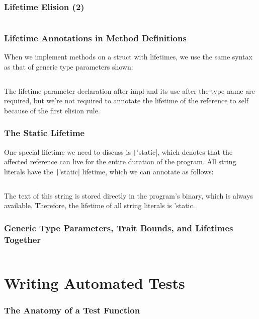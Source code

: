 \documentclass{beamer}
\begin{document}
\begin{frame}[fragile]
	\frametitle{Lifetime Elision (2)}
	
	\inputminted[fontsize=\scriptsize]{rust}{./code/lifetime7.rs}
\end{frame}


\begin{frame}[fragile]
	\frametitle{Lifetime Annotations in Method Definitions}
	When we implement methods on a struct with lifetimes, we use the same syntax as that of generic type parameters shown: 
	
	\inputminted{rust}{./code/lifetime8.rs}
	
	The lifetime parameter declaration after impl and its use after the type name are required, but we’re not required to annotate the lifetime of the reference to self because of the first elision rule.
\end{frame}

\begin{frame}[fragile]
	\frametitle{The Static Lifetime}
	One special lifetime we need to discuss is \texttt|'static|, which denotes that the affected reference can live for the entire duration of the program. All string literals have the \texttt|'static| lifetime, which we can annotate as follows:
	
	\inputminted{rust}{./code/lifetime9.rs}
	
	The text of this string is stored directly in the program’s binary, which is always available. Therefore, the lifetime of all string literals is 'static.
\end{frame}


\begin{frame}[fragile]
	\frametitle{Generic Type Parameters, Trait Bounds, and Lifetimes Together}
	
	\inputminted{rust}{./code/lifetime10.rs}
\end{frame}

\section{Writing Automated Tests}

\begin{frame}[fragile]
	\frametitle{The Anatomy of a Test Function}
	
	\inputminted{rust}{./code/test1.rs}
	
	\inputminted[fontsize=\scriptsize]{shell}{./code/test1.shell}
\end{frame}
\end{document}
